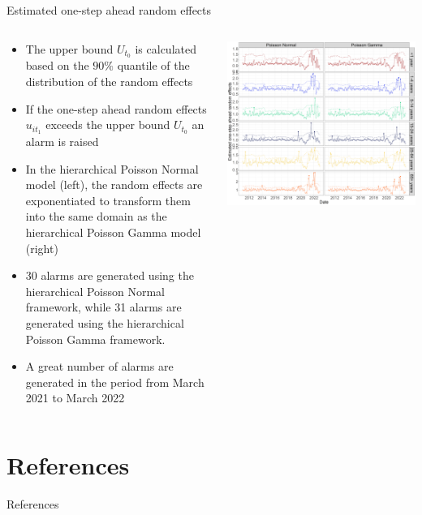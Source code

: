 \documentclass[aspectratio=169]{beamer}
\begin{document}
\begin{frame}{Estimated one-step ahead random effects}
\begin{columns}
\begin{column}{.53\textwidth}
\begin{itemize}
  \item<1> The upper bound $U_{t_0}$ is calculated based on the $90\%$ quantile of the distribution of the random effects
  \item<1> If the one-step ahead random effects $u_{it_1}$ exceeds the upper bound $U_{t_0}$ an alarm is raised
  \item<1> In the hierarchical Poisson Normal model (left), the random effects are exponentiated to transform them into the same domain as the hierarchical Poisson Gamma model (right)
\end{itemize}
\vspace{.3cm}
\begin{itemize}
  \item<2> 30 alarms are generated using the hierarchical Poisson Normal framework, while 31 alarms are generated using the hierarchical Poisson Gamma framework.
  \item<2> A great number of alarms are generated in the period from March 2021 to March 2022
\end{itemize}
\end{column}
\hfill
\begin{column}{.43\textwidth}

 \tiny


\includegraphics[width=1\linewidth]{../figures/Compare_novel_STEC} 

 \normalsize
\end{column}
\end{columns}
\end{frame}

\hypertarget{references}{%
\section{References}\label{references}}

\begin{frame}{References}
\printbibliography[heading=none]
\end{frame}
\end{document}
